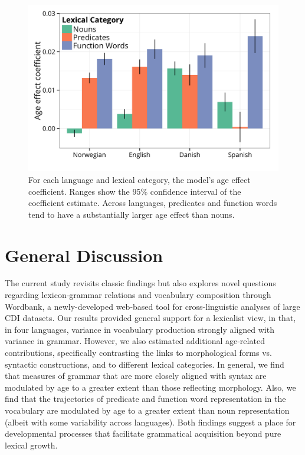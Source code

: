 \documentclass[10pt,letterpaper]{article}
\begin{document}
\begin{figure}
\centering
\includegraphics[width=\linewidth]{plots/vocab_coef_plot-1.png}
\caption{\label{fig:coefs_vocab_comp} For each language and lexical category, the model's age effect coefficient. Ranges show the 95\% confidence interval of the coefficient estimate. Across languages, predicates and function words tend to have a substantially larger age effect than nouns.}
\end{figure}

\section{General Discussion}

The current study revisits classic findings but also explores novel questions regarding lexicon-grammar relations and vocabulary composition through Wordbank, a newly-developed web-based tool for cross-linguistic analyses of large CDI datasets. Our results provided general support for a lexicalist view, in that, in four languages, variance in vocabulary production strongly aligned with variance in grammar. However, we also estimated additional age-related contributions, specifically contrasting the links to morphological forms vs. syntactic constructions, and to different lexical categories. In general, we find that measures of grammar that are more closely aligned with syntax are modulated by age to a greater extent than those reflecting morphology. Also, we find that the trajectories of predicate and function word representation in the vocabulary are modulated by age to a greater extent than noun representation (albeit with some variability across languages). Both findings suggest a place for developmental processes that facilitate grammatical acquisition beyond pure lexical growth.
\end{document}
